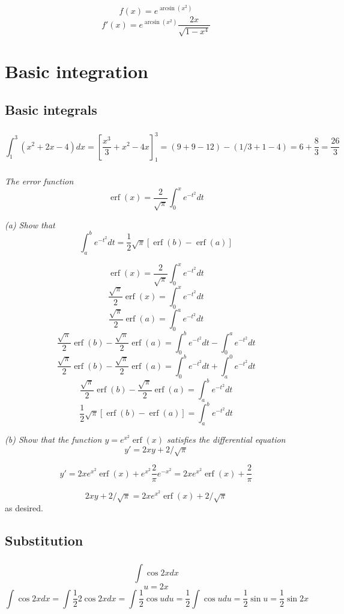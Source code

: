 \documentclass[11pt,oneside,titlepage]{book}
\DeclareMathOperator\erf{erf}
\begin{document}
$$f(x) = e^{\arcsin(x^2)}$$
$$f'(x) = e^{\arcsin(x^2)}\frac{2x}{\sqrt{1 - x^4}}$$


\chapter{Basic integration}

\section{Basic integrals}

\subsection{}
$$\int_1^3{(x^2 + 2x - 4)dx} =
[\frac{x^3}{3} + x^2 - 4x]_1^3 = (9 + 9 - 12) - (1/3 + 1 - 4) = 6 + \frac{8}{3} = \frac{26}{3}$$

\subsection{}
\textit{The error function}
$$\erf(x) = \frac{2}{\sqrt{\pi}}\int_0^x{e^{-t^2}dt}$$

\textit{(a) Show that }
$$\int_a^b{e^{-t^2}dt} = \frac{1}{2} \sqrt{\pi} [\erf(b) - \erf(a)]$$

$$\erf(x) = \frac{2}{\sqrt{\pi}}\int_0^x{e^{-t^2}dt}$$
$$\frac{\sqrt{\pi} }{2} \erf(x) = \int_0^x{e^{-t^2}dt}$$
$$\frac{\sqrt{\pi} }{2} \erf(a) = \int_0^a{e^{-t^2}dt}$$
$$\frac{\sqrt{\pi} }{2} \erf(b) - \frac{\sqrt{\pi} }{2} \erf(a) =
\int_0^b{e^{-t^2}dt} - \int_0^a{e^{-t^2}dt}$$
$$\frac{\sqrt{\pi} }{2} \erf(b) - \frac{\sqrt{\pi} }{2} \erf(a) =
\int_0^b{e^{-t^2}dt} + \int_a^0{e^{-t^2}dt}$$
$$\frac{\sqrt{\pi} }{2} \erf(b) - \frac{\sqrt{\pi} }{2} \erf(a) =
\int_a^b{e^{-t^2}dt}$$
$$\frac{1}{2} \sqrt{\pi}  [\erf(b) - \erf(a)] = \int_a^b{e^{-t^2}dt}$$

\textit{(b) Show that the function $y = e^{x^2}\erf(x)$ satisfies the differential equation
  $$y' = 2xy + 2 / \sqrt{\pi}$$}

$$y' = 2x e^{x^2} \erf(x) + e^{x^2} \frac{2}{\pi} e^{-x^2} =
2x e^{x^2} \erf(x) +  \frac{2}{\pi}
$$

$$2xy + 2/\sqrt \pi = 2x e^{x^2}\erf(x) + 2/\sqrt \pi$$
as desired.

\section{Substitution}

\subsection{}
$$\int{\cos 2x dx}$$
$$u = 2x$$
$$\int{\cos 2x dx} = \int{\frac 1 2 2 \cos 2x dx} = \int{\frac 1 2 \cos u du} =
\frac 1 2  \int{\cos u du} = 
\frac 1 2 \sin u = \frac 1 2 \sin 2x$$
\end{document}
